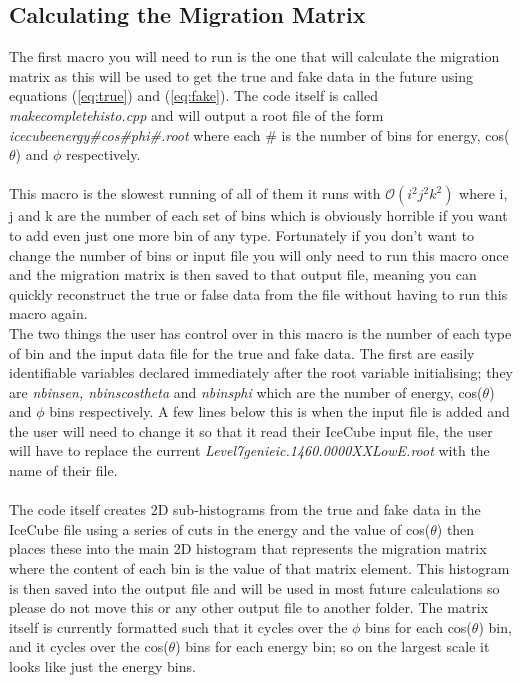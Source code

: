 \documentclass[12pt]{article}
\numberwithin{equation}{section}
\numberwithin{figure}{section}
\begin{document}
\subsection{Calculating the Migration Matrix} %
\label{sub:calculating_the_migration_matrix}
The first macro you will need to run is the one that will calculate the migration matrix as this will be used to get the true and fake data in the future using equations (\ref{eq:true}) and (\ref{eq:fake}). The code itself is called \emph{make\textunderscore complete\textunderscore histo.cpp} and will output a root file of the form \emph{icecube\textunderscore energy\textunderscore \#\textunderscore cos\textunderscore \#\textunderscore phi\textunderscore\#.root} where each $\#$ is the number of bins for energy, cos($\theta$) and $\phi$ respectively.\\
\\
This macro is the slowest running of all of them it runs with $\mathcal{O}(i^2j^2k^2)$ where i, j and k are the number of each set of bins which is obviously horrible if you want to add even just one more bin of any type. Fortunately if you don't want to change the number of bins or input file you will only need to run this macro once and the migration matrix is then saved to that output file, meaning you can quickly reconstruct the true or false data from the file without having to run this macro again.
\\
The two things the user has control over in this macro is the number of each type of bin and the input data file for the true and fake data. The first are easily identifiable variables declared immediately after the root variable initialising; they are \emph{nbins\textunderscore en, nbins\textunderscore cos\textunderscore theta} and \emph{nbins\textunderscore phi} which are the number of energy, cos($\theta$) and $\phi$ bins respectively. A few lines below this is when the input file is added and the user will need to change it so that it read their IceCube input file, the user will have to replace the current \emph{Level7\textunderscore genie\textunderscore ic.1460.0000XX\textunderscore LowE.root} with the name of their file.\\
\\
The code itself creates 2D sub-histograms from the true and fake data in the IceCube file using a series of cuts in the energy and the value of cos($\theta$) then places these into the main 2D histogram that represents the migration matrix where the content of each bin is the value of that matrix element. This histogram is then saved into the output file and will be used in most future calculations so please do not move this or any other output file to another folder. The matrix itself is currently formatted such that it cycles over the $\phi$ bins for each cos($\theta$) bin, and it cycles over the cos($\theta$) bins for each energy bin; so on the largest scale it looks like just the energy bins.
%
\end{document}
